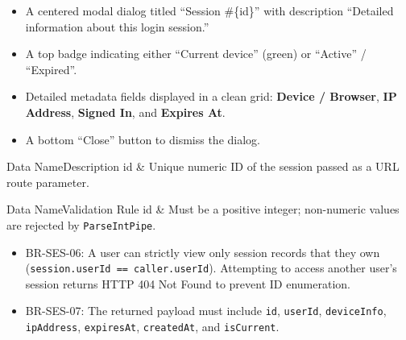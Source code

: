 \begin{itemize}[leftmargin=1.6em,topsep=3pt,itemsep=2pt,parsep=0pt,label=$\bullet$]
    \item A centered modal dialog titled ``Session \#\{id\}'' with description ``Detailed information about this login session.''
    \item A top badge indicating either ``Current device'' (green) or ``Active'' / ``Expired''.
    \item Detailed metadata fields displayed in a clean grid: \textbf{Device / Browser}, \textbf{IP Address}, \textbf{Signed In}, and \textbf{Expires At}.
    \item A bottom ``Close'' button to dismiss the dialog.
\end{itemize}


\begin{specdatatable}{Data Name}{Description}
id & Unique numeric ID of the session passed as a URL route parameter.\\ \hline
\end{specdatatable}

\begin{specdatatable}{Data Name}{Validation Rule}
id & Must be a positive integer; non-numeric values are rejected by \texttt{ParseIntPipe}.\\ \hline
\end{specdatatable}

\begin{itemize}[leftmargin=1.6em,topsep=3pt,itemsep=2pt,parsep=0pt,label=$\bullet$]\brrulelist
    \item BR-SES-06: A user can strictly view only session records that they own (\texttt{session.userId == caller.userId}). Attempting to access another user's session returns HTTP 404 Not Found to prevent ID enumeration.
    \item BR-SES-07: The returned payload must include \texttt{id}, \texttt{userId}, \texttt{deviceInfo}, \texttt{ipAddress}, \texttt{expiresAt}, \texttt{createdAt}, and \texttt{isCurrent}.
\end{itemize}

